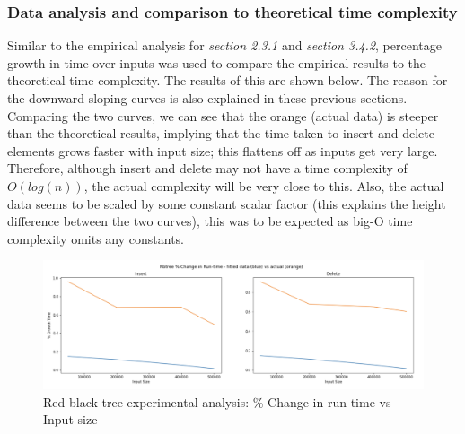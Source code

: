 \documentclass[11p]{article}
\def\nl{\newline}
\begin{document}
\subsubsection{Data analysis and comparison to theoretical time complexity}
Similar to the empirical analysis for \textit{section 2.3.1}  and \textit{section 3.4.2}, percentage growth in time over inputs was used to compare the empirical results to the theoretical time complexity. The results of this are shown below. The reason for the downward sloping curves is also explained in these previous sections. \nl
Comparing the two curves, we can see that the orange (actual data) is steeper than the theoretical results, implying that the time taken to insert and delete elements grows faster with input size; this flattens off as inputs get very large. Therefore, although insert and delete may not have a time complexity of $O(log(n))$, the actual complexity will be very close to this. Also, the actual data seems to be scaled by some constant scalar factor (this explains the height difference between the two curves), this was to be expected as big-O time complexity omits any constants.
\begin{figure}[hbt!]
	\centering
	\includegraphics[width=0.7\linewidth]{experimental_results/rbtreecomp.png}
	\caption{Red black tree experimental analysis: \% Change in run-time vs Input size}
\end{figure}

\pagebreak
\end{document}
